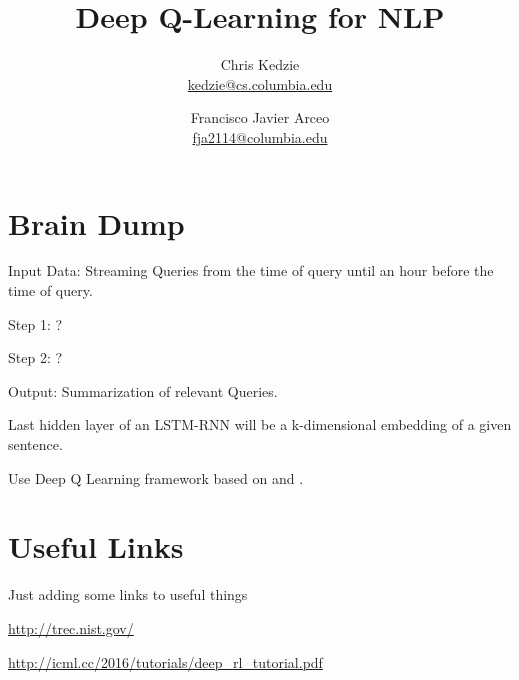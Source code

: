 \documentclass[12pt]{article}
\title{Deep Q-Learning for NLP}
\author{
	Chris Kedzie \\ \href{mailto: kedzie@cs.columbia.edu}{\small kedzie@cs.columbia.edu} 
		\and  
	Francisco Javier Arceo \\ \href{mailto: fja2114@columbia.edu}{\small fja2114@columbia.edu} 
	}
\begin{document}
\maketitle




\section{Brain Dump}

Input Data: Streaming Queries from the time of query until an hour before the time of query. 

Step 1:  ?

Step 2:  ?

Output: Summarization of relevant Queries.

Last hidden layer of an LSTM-RNN will be a k-dimensional embedding of a given sentence. 

Use Deep Q Learning framework based on \cite{MnihKSGAWR13} and \cite{DBLP:journals/corr/MnihBMGLHSK16}.

\section{Useful Links}

Just adding some links to useful things 

\url{http://trec.nist.gov/}

\url{http://icml.cc/2016/tutorials/deep_rl_tutorial.pdf}


\end{document}
